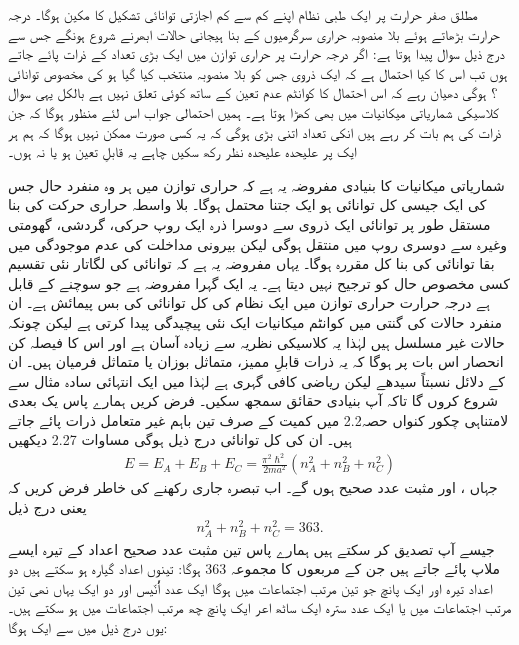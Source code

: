 مطلق صفر حرارت پر ایک طبی نظام اپنے کم سے کم اجازتی توانائی  تشکیل کا مکین ہوگا۔ درجہ حرارت بڑھاتے ہوئے بلا منصوبہ حراری سرگرمیوں کے بنا ہیجانی حالات ابھرنے شروع ہونگے جس سے درج ذیل سوال پیدا ہوتا ہے: اگر  درجہ حرارت پر حراری توازن میں ایک بڑی تعداد  کے ذرات پائے جاتے ہوں تب اس کا کیا احتمال ہے کہ ایک ذروی جس کو بلا منصوبہ منتخب کیا گیا ہو کی مخصوص توانائی ؟ ہوگی دھیان رہے کہ اس احتمال کا کوانٹم عدم تعین کے ساتھ کوئی تعلق نہیں ہے بالکل یہی سوال کلاسیکی شماریاتی میکانیات میں بھی کھڑا ہوتا ہے۔ ہمیں احتمالی جواب اس لئے منظور ہوگا کہ جن ذرات کی ہم بات کر رہے ہیں انکی تعداد اتنی بڑی ہوگی کہ یہ کسی صورت ممکن نہیں ہوگا کہ ہم ہر ایک پر علیحدہ علیحدہ نظر رکھ سکیں چاہے یہ قابلِ تعین ہو یا نہ ہوں۔

شماریاتی میکانیات کا بنیادی مفروضہ یہ ہے کہ حراری توازن میں ہر وہ منفرد حال جس کی ایک جیسی کل توانائی  ہو ایک جتنا محتمل ہوگا۔ بلا واسطہ حراری حرکت کی بنا مستقل طور پر توانائی ایک ذروی سے دوسرا ذرہ ایک روپ حرکی، گردشی، گھومتی وغیرہ سے دوسری روپ میں منتقل ہوگی لیکن بیرونی مداخلت کی عدم موجودگی میں بقا  توانائی کی بنا کل مقررہ ہوگا۔ یہاں مفروضہ یہ ہے  کہ توانائی کی لگاتار نئی تقسیم کسی مخصوص حال کو ترجیح نہیں دیتا ہے۔ یہ ایک گہرا مفروضہ ہے جو سوچنے کے قابل ہے درجہ حرارت  حراری توازن میں ایک نظام کی کل توانائی کی بس پیمائش ہے۔ ان منفرد حالات کی گنتی میں کوانٹم میکانیات ایک نئی پیچیدگی پیدا کرتی ہے لیکن چونکہ حالات غیر مسلسل ہیں لہٰذا یہ کلاسیکی نظریہ سے زیادہ آسان ہے اور اس کا فیصلہ کن انحصار اس بات پر ہوگا کہ یہ ذرات قابلِ ممیز، متماثل بوزان یا متماثل فرمیان ہیں۔ ان کے دلائل نسبتاً سیدھے لیکن ریاضی کافی گہری ہے لہٰذا میں ایک انتہائی سادہ  مثال سے شروع کروں گا تاکہ آپ بنیادی حقائق سمجھ سکیں۔
فرض کریں ہمارے پاس یک بعدی لامتناہی چکور کنواں حصہ\num{2.2} میں کمیت  کے صرف تین باہم غیر متعامل ذرات پائے جاتے ہیں۔ ان کی کل توانائی درج ذیل ہوگی مساوات \num{2.27} دیکھیں
\begin{align}
	E = E_A + E_B + E_C = \frac{\pi^2 \hslash ^2}{2ma^2}(n^2_A + n^2_B + n^2_C)
\end{align}
جہاں ،  اور  مثبت عدد صحیح ہوں گے۔ اب تبصرہ جاری رکھنے کی خاطر فرض کریں کہ یعنی درج ذیل
\begin{align}
	n^2_A + n^2_B + n^2_C = 363.
\end{align}  
جیسے آپ تصدیق کر سکتے ہیں ہمارے پاس تین مثبت عدد صحیح اعداد کے تیرہ  ایسے ملاپ  پائے جاتے ہیں جن کے مربعوں کا مجموعہ \num{363} ہوگا: تینوں اعداد گیارہ ہو سکتے ہیں دو اعداد تیرہ  اور ایک پانچ جو تین مرتب اجتماعات میں ہوگا ایک عدد اُٗنّیس اور دو ایک یہاں نھی تین مرتب اجتماعات میں یا ایک عدد سترہ ایک ساٹھ اعر ایک پانچ چھ مرتب اجتماعات میں ہو سکتے ہیں۔ یوں   درج ذیل میں سے ایک ہوگا:
